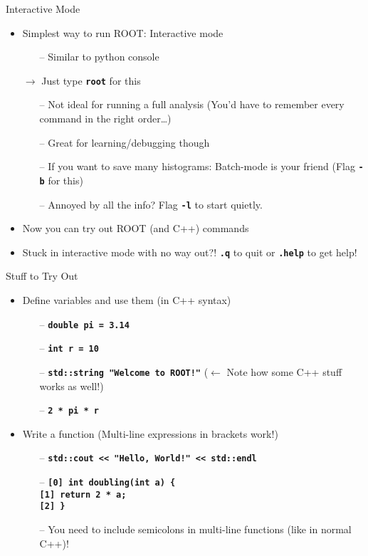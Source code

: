 \documentclass[10pt, aspectratio=169]{beamer}
\begin{document}
\begin{frame}{Interactive Mode}
  \begin{itemize}
    \item
      Simplest way to run ROOT: Interactive mode
    \begin{itemize}
      \item[--] Similar to python console
    \end{itemize}
    \item[$\rightarrow$]
      Just type \textbf{\texttt{root}} for this
    \begin{itemize}
      \item[--] Not ideal for running a full analysis (You'd have to remember every command in the right order\ldots)
      \item[--] Great for learning/debugging though
      \item[--] If you want to save many histograms: Batch-mode is your friend (Flag \textbf{\texttt{-b}} for this)
      \item[--] Annoyed by all the info? Flag \textbf{\texttt{-l}} to start quietly.
    \end{itemize}
    \item
      Now you can try out ROOT (and C++) commands
    \item
      Stuck in interactive mode with no way out?! \textbf{\texttt{.q}} to quit or \textbf{\texttt{.help}} to get help!
  \end{itemize}
\end{frame}

\begin{frame}{Stuff to Try Out}
  \begin{itemize}
    \item
      Define variables and use them (in C++ syntax)
    \begin{itemize}
      \item[--] \textbf{\texttt{double pi = 3.14}}
      \item[--] \textbf{\texttt{int r = 10}}
      \item[--] \textbf{\texttt{std::string "Welcome to ROOT!"}} ($\leftarrow$ Note how some C++ stuff works as well!)
      \item[--] \textbf{\texttt{2 * pi * r}}
    \end{itemize}
    \item
      Write a function (Multi-line expressions in brackets work!)
    \begin{itemize}
      \item[--] \textbf{\texttt{std::cout << "Hello, World!" << std::endl}}
      \item[--] \textbf{\texttt{[0] int doubling(int a) \{}} \\
                \textbf{\texttt{[1] return 2 * a;}} \\
                \textbf{\texttt{[2] \}}}
      \item[--] You need to include semicolons in multi-line functions (like in normal C++)!
    \end{itemize}
  \end{itemize}
  
\end{frame}
\end{document}
